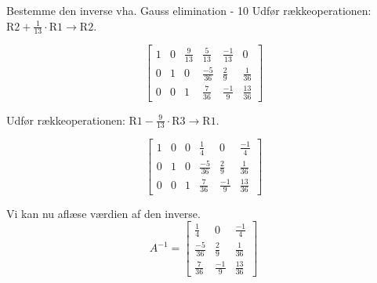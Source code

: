 \documentclass{article}
\begin{document}
\begin{exercise}{Bestemme den inverse vha. Gauss elimination - 10}
	\hint
	Udfør rækkeoperationen: $\text{R2} + \frac{1}{13} \cdot \text{R1} \to \text{R2}$.
	
	\hint
	\[
	\left[\begin{array}{ccc|ccc}
	1 & 0 & \frac{9}{13} & \frac{5}{13} & \frac{-1}{13} & 0 \\ 
	0 & 1 & 0 & \frac{-5}{36} & \frac{2}{9} & \frac{1}{36} \\
	0 & 0 & 1 & \frac{7}{36} & \frac{-1}{9} & \frac{13}{36}
	\end{array} \right]
	\]
	
	\hint
	Udfør rækkeoperationen: $\text{R1} - \frac{9}{13} \cdot \text{R3} \to \text{R1}$.

	\hint
	\[
	\left[\begin{array}{ccc|ccc}
	1 & 0 & 0 & \frac{1}{4} & 0 & \frac{-1}{4} \\ 
	0 & 1 & 0 & \frac{-5}{36} & \frac{2}{9} & \frac{1}{36} \\
	0 & 0 & 1 & \frac{7}{36} & \frac{-1}{9} & \frac{13}{36}
	\end{array} \right]
	\]
	
	
	\hint
	Vi kan nu aflæse værdien af den inverse.
	\[
	A^{-1} = \left[\begin{array}{ccc}
	\frac{1}{4} & 0 & \frac{-1}{4} \\ 
	\frac{-5}{36} & \frac{2}{9} & \frac{1}{36} \\
	\frac{7}{36} & \frac{-1}{9} & \frac{13}{36}
	\end{array} \right]
	\]
	
	
\end{exercise}
\end{document}

